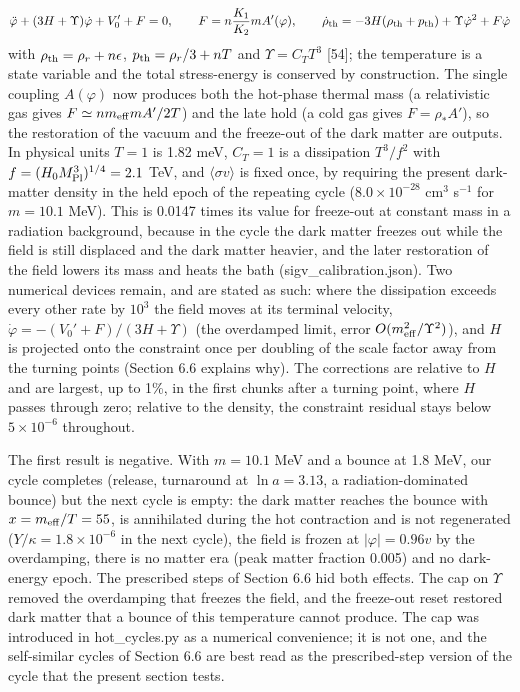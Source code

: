\documentclass[11pt,a4paper]{article}
\begin{document}
\begin{equation}
\ddot\varphi+(3H+\Upsilon)\dot\varphi+V_0'+F=0,\qquad F=n\frac{K_1}{K_2}mA'(\varphi),\qquad \dot\rho_{\rm th}=-3H(\rho_{\rm th}+p_{\rm th})+\Upsilon\dot\varphi^2+F\dot\varphi
\end{equation}
with $\rho_{\rm th}=\rho_r+n\epsilon$, $p_{\rm th}=\rho_r/3+nT$ and $\Upsilon=C_TT^3$ [54]; the temperature is a state variable and the total stress-energy is conserved by construction. The single coupling $A(\varphi)$ now produces both the hot-phase thermal mass (a relativistic gas gives $F\simeq nm_{\rm eff}mA'/2T$) and the late hold (a cold gas gives $F=\rho_*A'$), so the restoration of the vacuum and the freeze-out of the dark matter are outputs. In physical units $T=1$ is 1.82 meV, $C_T=1$ is a dissipation $T^3/f^2$ with $f=(H_0M_{\rm Pl}^3)^{1/4}=2.1$ TeV, and $\langle\sigma v\rangle$ is fixed once, by requiring the present dark-matter density in the held epoch of the repeating cycle ($8.0\times10^{-28}$ cm$^3$ s$^{-1}$ for $m=10.1$ MeV). This is 0.0147 times its value for freeze-out at constant mass in a radiation background, because in the cycle the dark matter freezes out while the field is still displaced and the dark matter heavier, and the later restoration of the field lowers its mass and heats the bath (sigv\_calibration.json). Two numerical devices remain, and are stated as such: where the dissipation exceeds every other rate by $10^3$ the field moves at its terminal velocity, $\dot\varphi=-(V_0'+F)/(3H+\Upsilon)$ (the overdamped limit, error $O(m_{\rm eff}^2/\Upsilon^2)$), and $H$ is projected onto the constraint once per doubling of the scale factor away from the turning points (Section 6.6 explains why). The corrections are relative to $H$ and are largest, up to 1\%, in the first chunks after a turning point, where $H$ passes through zero; relative to the density, the constraint residual stays below $5\times10^{-6}$ throughout.

The first result is negative. With $m=10.1$ MeV and a bounce at 1.8 MeV, our cycle completes (release, turnaround at $\ln a=3.13$, a radiation-dominated bounce) but the next cycle is empty: the dark matter reaches the bounce with $x=m_{\rm eff}/T=55$, is annihilated during the hot contraction and is not regenerated ($Y/\kappa=1.8\times10^{-6}$ in the next cycle), the field is frozen at $|\varphi|=0.96v$ by the overdamping, there is no matter era (peak matter fraction 0.005) and no dark-energy epoch. The prescribed steps of Section 6.6 hid both effects. The cap on $\Upsilon$ removed the overdamping that freezes the field, and the freeze-out reset restored dark matter that a bounce of this temperature cannot produce. The cap was introduced in hot\_cycles.py as a numerical convenience; it is not one, and the self-similar cycles of Section 6.6 are best read as the prescribed-step version of the cycle that the present section tests.
\end{document}
